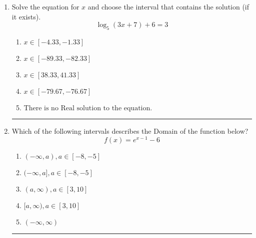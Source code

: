 \documentclass[14pt]{extbook}
\newcommand{\litem}[1]{\item#1\hspace*{-1cm}\rule{\textwidth}{0.4pt}}
\begin{document}
\begin{enumerate}
{\begin{enumerate}[label=\Alph*.]
\end{enumerate} }
\litem{
Solve the equation for $x$ and choose the interval that contains the solution (if it exists).\[ \log_{5}{(3x+7)}+6 = 3 \]\begin{enumerate}[label=\Alph*.]
\item \( x \in [-4.33, -1.33] \)
\item \( x \in [-89.33, -82.33] \)
\item \( x \in [38.33, 41.33] \)
\item \( x \in [-79.67, -76.67] \)
\item \( \text{There is no Real solution to the equation.} \)

\end{enumerate} }
\litem{
Which of the following intervals describes the Domain of the function below?\[ f(x) = e^{x-1}-6 \]\begin{enumerate}[label=\Alph*.]
\item \( (-\infty, a), a \in [-8, -5] \)
\item \( (-\infty, a], a \in [-8, -5] \)
\item \( (a, \infty), a \in [3, 10] \)
\item \( [a, \infty), a \in [3, 10] \)
\item \( (-\infty, \infty) \)

\end{enumerate} }
\end{enumerate}
\end{document}
